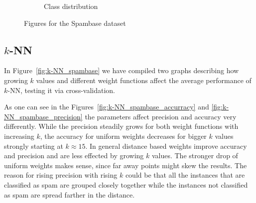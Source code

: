 \documentclass[a4paper,11pt]{article}
\begin{document}
\begin{figure}[h!]
\begin{subfigure}[c]{0.45\textwidth}
            \caption{Class distribution}
            \label{fig:spambase_classes_pie}
        \end{subfigure}
        \caption{Figures for the Spambase dataset}
        \label{fig:spambase}
    \end{figure}
    
    
    \subsection{$k$-NN}
        In Figure~\ref{fig:k-NN_spambase} we have compiled two graphs describing how growing $k$ values and different weight functions affect the average performance of $k$-NN, testing it via cross-validation.
        
        As one can see in the Figures~\ref{fig:k-NN_spambase_accurracy} and \ref{fig:k-NN_spambase_precision} the parameters affect precision and accuracy very differently. While the precision steadily grows for both weight functions with increasing $k$, the accuracy for uniform weights decreases for bigger $k$ values strongly starting at $k\approx 15$. In general distance based weights improve accuracy and precision and are less effected by growing $k$ values.
        The stronger drop of uniform weights makes sense, since far away points might skew the results. The reason for rising precision with rising $k$ could be that all the instances that are classified as spam are grouped closely together while the instances not classified as spam are spread farther in the distance.
        
\end{document}

